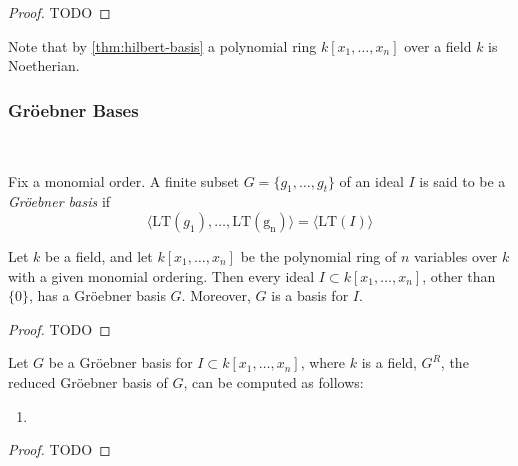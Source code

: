 \begin{proof}
  TODO
\end{proof}

Note that by \cref{thm:hilbert-basis} a polynomial ring $k[x_1, \ldots, x_n]$ over a field $k$ is Noetherian.

\subsubsection{Gr\"oebner Bases}

\leavevmode \\


\begin{definition}
  Fix a monomial order. A finite subset $G = \{ g_1, \ldots, g_t \}$ of an ideal $I$ is said to be a \emph{Gr\"oebner basis} if
  \begin{equation*}
    \langle \mathrm{LT}(g_1), \ldots, \mathrm{LT(g_n)} \rangle = \langle \mathrm{LT}(I) \rangle
  \end{equation*}
\end{definition}

\begin{proposition}
  Let $k$ be a field, and let $k[x_1, \ldots, x_n]$ be the polynomial ring of $n$ variables over $k$ with a given monomial ordering. Then every ideal $I \subset k[x_1, \ldots, x_n]$, other than $\{ 0 \}$, has a Gr\"oebner basis $G$. Moreover, $G$ is a basis for $I$.
\end{proposition}

\begin{proof}
  TODO
\end{proof}


\begin{proposition}
  Let $G$ be a Gr\"oebner basis for $I \subset k[x_1, \ldots, x_n]$, where $k$ is a field, $G^R$, the reduced Gr\"oebner basis of $G$, can be computed as follows:
  \begin{enumerate}
    \item {}
  \end{enumerate}
\end{proposition}

\begin{proof}
  TODO
\end{proof}

